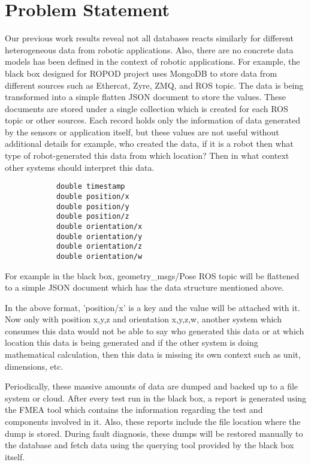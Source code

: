

	\let\cleardoublepage\clearpage
\chapter{Problem Statement} \label{sec:problem_statement}
Our previous work results reveal not all databases reacts similarly for different heterogeneous data from robotic applications. Also, there are no concrete data models has been defined in the context of robotic applications. For example, the black box designed for ROPOD project uses MongoDB to store data from different sources such as Ethercat, Zyre, ZMQ, and ROS topic. The data is being transformed into a simple flatten JSON document to store the values. These documents are stored under a single collection which is created for each ROS topic or other sources. Each record holds only the information of data generated by the sensors or application itself, but these values are not useful without additional details for example, who created the data, if it is a robot then what type of robot-generated this data from which location? Then in what context other systems should interpret this data.

\begin{center}
	\lstset{%
		caption=geometry\_msgs/Pose ROS topic,
		basicstyle=\ttfamily\footnotesize\bfseries,
		frame=tb
	}
\begin{lstlisting}
			double timestamp
			double position/x
			double position/y
			double position/z
			double orientation/x
			double orientation/y
			double orientation/z
			double orientation/w
\end{lstlisting}
\end{center}

For example in the black box, geometry\_msgs/Pose ROS topic will be flattened to a simple JSON document which has the data structure mentioned above.

In the above format, 'position/x' is a key and the value will be attached with it. Now only with position x,y,z and orientation x,y,z,w, another system which consumes this data would not be able to say who generated this data or at which location this data is being generated and if the other system is doing mathematical calculation, then this data is missing its own context such as unit, dimensions, etc.

Periodically, these massive amounts of data are dumped and backed up to a file system or cloud. After every test run in the black box, a report is generated using the FMEA tool which contains the information regarding the test and components involved in it. Also, these reports include the file location where the dump is stored. During fault diagnosis, these dumps will be restored manually to the database and fetch data using the querying tool provided by the black box itself. 

